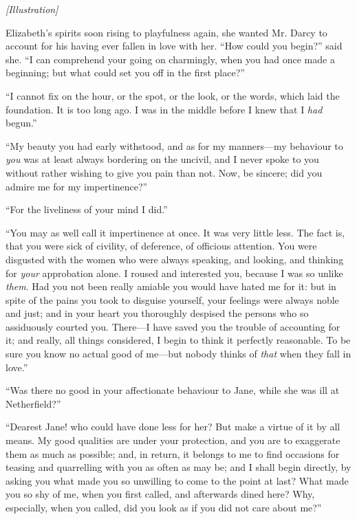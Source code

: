 \documentclass[12pt]{book}
\begin{document}
\emph{[Illustration]}

Elizabeth's spirits soon rising to playfulness again, she wanted Mr. Darcy to account for his having ever fallen in love with her. ``How could you begin?'' said she. ``I can comprehend your going on charmingly, when you had once made a beginning; but what could set you off in the first place?''

``I cannot fix on the hour, or the spot, or the look, or the words, which laid the foundation. It is too long ago. I was in the middle before I knew that I \textit{had} begun.''

``My beauty you had early withstood, and as for my manners---my behaviour to \textit{you} was at least always bordering on the uncivil, and I never spoke to you without rather wishing to give you pain than not. Now, be sincere; did you admire me for my impertinence?''

``For the liveliness of your mind I did.''

``You may as well call it impertinence at once. It was very little less. The fact is, that you were sick of civility, of deference, of officious attention. You were disgusted with the women who were always speaking, and looking, and thinking for \textit{your} approbation alone. I roused and interested you, because I was so unlike \textit{them}. Had you not been really amiable you would have hated me for it: but in spite of the pains you took to disguise yourself, your feelings were always noble and just; and in your heart you thoroughly despised the persons who so assiduously courted you. There---I have saved you the trouble of accounting for it; and really, all things considered, I begin to think it perfectly reasonable. To be sure you know no actual good of me---but nobody thinks of \textit{that} when they fall in love.''

``Was there no good in your affectionate behaviour to Jane, while she was ill at Netherfield?''

``Dearest Jane! who could have done less for her? But make a virtue of it by all means. My good qualities are under your protection, and you are to exaggerate them as much as possible; and, in return, it belongs to me to find occasions for teasing and quarrelling with you as often as may be; and I shall begin directly, by asking you what made you so unwilling to come to the point at last? What made you so shy of me, when you first called, and afterwards dined here? Why, especially, when you called, did you look as if you did not care about me?''
\end{document}
